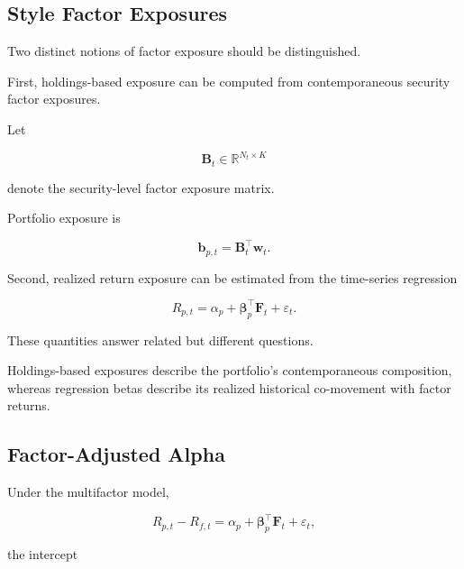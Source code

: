 \documentclass[11pt,a4paper]{article}
\begin{document}
\subsection{Style Factor Exposures}

Two distinct notions of factor exposure should be distinguished.

First, holdings-based exposure can be computed from contemporaneous security
factor exposures.

Let

\begin{equation}
\mathbf{B}_t
\in
\mathbb{R}^{N_t\times K}
\end{equation}

denote the security-level factor exposure matrix.

Portfolio exposure is

\begin{equation}
\boxed{
\mathbf{b}_{p,t}
=
\mathbf{B}_t^\top
\mathbf{w}_t.
}
\end{equation}

Second, realized return exposure can be estimated from the time-series
regression

\begin{equation}
R_{p,t}
=
\alpha_p
+
\boldsymbol{\beta}_p^\top
\mathbf{F}_t
+
\varepsilon_t.
\end{equation}

These quantities answer related but different questions.

Holdings-based exposures describe the portfolio's contemporaneous composition,
whereas regression betas describe its realized historical co-movement with
factor returns.


\subsection{Factor-Adjusted Alpha}

Under the multifactor model,

\begin{equation}
R_{p,t}-R_{f,t}
=
\alpha_p
+
\boldsymbol{\beta}_p^\top
\mathbf{F}_t
+
\varepsilon_t,
\end{equation}

the intercept
\end{document}

